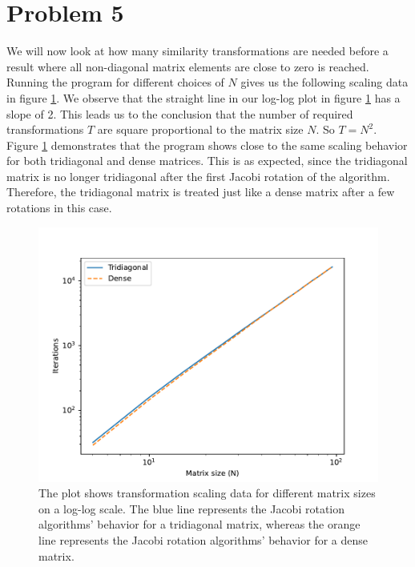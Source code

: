 \documentclass[english,notitlepage]{revtex4-1}  %
\begin{document}
\section*{Problem 5}
We will now look at how many similarity transformations are needed
before a result where all non-diagonal matrix elements
are close to zero is reached. \\

Running the program for different choices of $N$
gives us the following scaling data in figure \ref{fig:N_iter_log_both}.
We observe that the straight line in our log-log plot in figure \ref{fig:N_iter_log_both}
has a slope of 2. This leads us to the conclusion that the number of required transformations $T$ are
square proportional to the matrix size $N$. So $T = N^2$. \\

Figure \ref{fig:N_iter_log_both} demonstrates that the program shows close to
the same scaling behavior for both tridiagonal and dense matrices.
This is as expected, since the tridiagonal matrix is
no longer tridiagonal after the first Jacobi rotation of the algorithm.
Therefore, the tridiagonal matrix is treated just like a dense matrix after a few
rotations in this case.

\begin{figure}[H]
    \centering
    \includegraphics[width=1.\textwidth]{../figures/N_iter_log_both.pdf}
    \caption{The plot shows transformation scaling data for different matrix sizes on a log-log scale.
    The blue line represents the Jacobi rotation algorithms' behavior for a tridiagonal matrix,
    whereas the orange line represents the Jacobi rotation algorithms' behavior for a dense matrix.}
    \label{fig:N_iter_log_both}
\end{figure}
\end{document}
